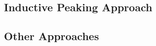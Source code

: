 \documentclass[rfvlsi_template_jrnl.tex]{subfiles}
\begin{document}

\subsection{Inductive Peaking Approach}



\subsection{Other Approaches}

\end{document}
